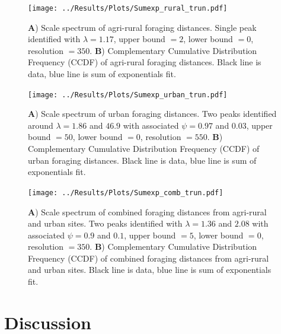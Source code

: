 \documentclass[11pt,usenames,dvipsnames,a4paper]{article}
\begin{document}
\begin{figure}[H]
	\centering
	\texttt{[image: ../Results/Plots/Sumexp\_rural\_trun.pdf]}
	\caption{\textbf{A}) Scale spectrum of agri-rural foraging distances. Single peak identified with $\lambda = 1.17$, upper bound $= 2$, lower bound $= 0$, resolution $= 350$. \textbf{B}) Complementary Cumulative Distribution Frequency (CCDF) of agri-rural foraging distances. Black line is data, blue line is sum of exponentials fit.}
\end{figure}

\begin{figure}[H]
	\centering
	\texttt{[image: ../Results/Plots/Sumexp\_urban\_trun.pdf]}
	\caption{\textbf{A}) Scale spectrum of urban foraging distances. Two peaks identified around $\lambda = 1.86$ and $46.9$ with associated $\psi = 0.97$ and $0.03$, upper bound $= 50$, lower bound $= 0$, resolution $= 550$. \textbf{B}) Complementary Cumulative Distribution Frequency (CCDF) of urban foraging distances. Black line is data, blue line is sum of exponentials fit.}
\end{figure}

\begin{figure}[H]
	\centering
	\texttt{[image: ../Results/Plots/Sumexp\_comb\_trun.pdf]}
	\caption{\textbf{A}) Scale spectrum of combined foraging distances from agri-rural and urban sites. Two peaks identified with $\lambda = 1.36$ and $2.08$ with associated $\psi = 0.9$ and $0.1$, upper bound $=5$, lower bound $= 0$, resolution $= 350$. \textbf{B}) Complementary Cumulative Distribution Frequency (CCDF) of combined foraging distances from agri-rural and urban sites. Black line is data, blue line is sum of exponentials fit.}
\end{figure}

\section{Discussion}
\end{document}
